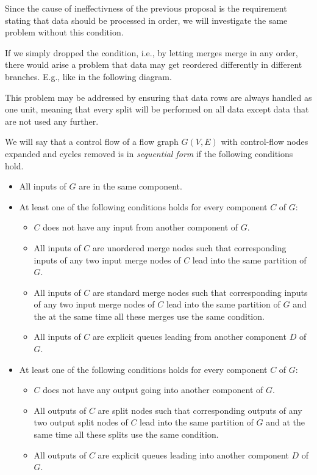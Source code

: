 Since the cause of ineffectivness of the previous proposal is the requirement stating that data should be processed in order, we will investigate the same problem without this condition. 


If we simply dropped the condition, i.e., by letting merges merge in any order, there would arise a problem that data may get reordered differently in different branches. E.g., like in the following diagram.


This problem may be addressed by ensuring that data rows are always handled as one unit, meaning that every split will be performed on all data except data that are not used any further.

\begin{define}
We will say that a control flow of a flow graph $G(V,E)$ with control-flow nodes expanded and cycles removed is in \emph{sequential form} if the following conditions hold.
\begin{itemize}
  \item All inputs of $G$ are in the same component.
  \item At least one of the following conditions holds for every component $C$ of $G$: 
    \begin{itemize}
      \item $C$ does not have any input from another component of $G$.
      \item All inputs of $C$ are unordered merge nodes such that corresponding inputs of any two input merge nodes of $C$ lead into the same partition of $G$.
      \item All inputs of $C$ are standard merge nodes such that corresponding inputs of any two input merge nodes of $C$ lead into the same partition of $G$ and the at the same time all these merges use the same condition.
      \item All inputs of $C$ are explicit queues leading from another component $D$ of $G$.
    \end{itemize}
  \item At least one of the following conditions holds for every component $C$ of $G$: 
    \begin{itemize}
      \item $C$ does not have any output going into another component of $G$.
      \item All outputs of $C$ are split nodes such that corresponding outputs of any two output split nodes of $C$ lead into the same partition of $G$ and at the same time all these splits use the same condition.
      \item All outputs of $C$ are explicit queues leading into another component $D$ of $G$.
    \end{itemize}
\end{itemize}
\end{define}

